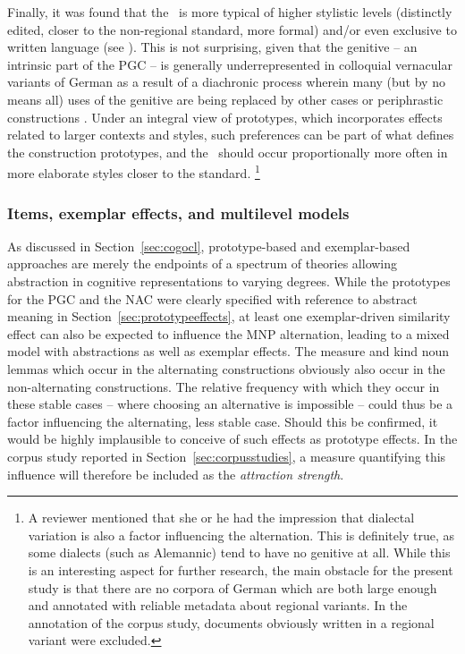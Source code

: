 Finally, it was found that the \PGCa\ is more typical of higher stylistic levels (distinctly edited, closer to the non-regional standard, more formal) and\slash or even exclusive to written language (see \citealp[320--323]{Hentschel1993}).
This is not surprising, given that the genitive -- an intrinsic part of the PGC -- is generally underrepresented in colloquial vernacular variants of German as a result of a diachronic process wherein many (but by no means all) uses of the genitive are being replaced by other cases or periphrastic constructions \citep{FleischerSchallert2011}.
Under an integral view of prototypes, which incorporates effects related to larger contexts and styles, such preferences can be part of what defines the construction prototypes, and the \PGCa\ should occur proportionally more often in more elaborate styles closer to the standard.%
\footnote{A reviewer mentioned that she or he had the impression that dialectal variation is also a factor influencing the alternation.
This is definitely true, as some dialects (such as Alemannic) tend to have no genitive at all.
While this is an interesting aspect for further research, the main obstacle for the present study is that there are no corpora of German which are both large enough and annotated with reliable metadata about regional variants.
In the annotation of the corpus study, documents obviously written in a regional variant were excluded.}

\subsubsection{Items, exemplar effects, and multilevel models}
\label{sec:itemandexemplareffects}

As discussed in Section~\ref{sec:cogocl}, prototype-based and exemplar-based approaches are merely the endpoints of a spectrum of theories allowing abstraction in cognitive representations to varying degrees.
While the prototypes for the PGC and the NAC were clearly specified with reference to abstract meaning in Section~\ref{sec:prototypeeffects}, at least one exemplar-driven similarity effect can also be expected to influence the MNP alternation, leading to a mixed model with abstractions as well as exemplar effects.
The measure and kind noun lemmas which occur in the alternating constructions obviously also occur in the non-alternating constructions.
The relative frequency with which they occur in these stable cases -- where choosing an alternative is impossible -- could thus be a factor influencing the alternating, less stable case.
Should this be confirmed, it would be highly implausible to conceive of such effects as prototype effects.
In the corpus study reported in Section~\ref{sec:corpusstudies}, a measure quantifying this influence will therefore be included as the \textit{attraction strength}.

